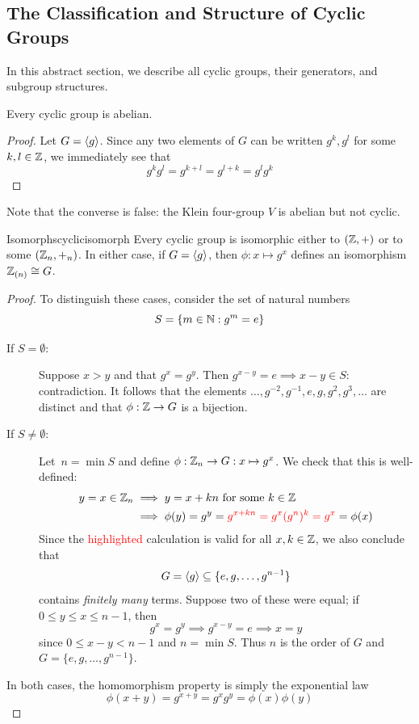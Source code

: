 \clearpage




\subsection{The Classification and Structure of Cyclic Groups}\label{sec:cyclicclass}

In this abstract section, we describe all cyclic groups, their generators, and subgroup structures.

\begin{lemm}{}{}
Every cyclic group is abelian.
\end{lemm}

\begin{proof}
Let $G=\left\langle g\right\rangle$. Since any two elements of $G$ can be written $g^k,g^l$ for some $k,l\in\mathbb{Z}$, we immediately see that
\[g^kg^l=g^{k+l}=g^{l+k}=g^lg^k\tag*{\qedhere}\]
\end{proof}

Note that the converse is false: the Klein four-group $V$ is abelian but not cyclic.




\begin{thm}{Isomorphs}{cyclicisomorph}
Every cyclic group is isomorphic either to $(\mathbb{Z},+)$ or to some $(\mathbb{Z}_n,+_n)$.\smallbreak
In either case, if $G=\left\langle g\right\rangle$, then $\phi:x\mapsto g^x$ defines an isomorphism $\mathbb{Z}_{(n)}\cong G$.
\end{thm}

\begin{proof}
To distinguish these cases, consider the set of natural numbers
\[S=\{m\in\mathbb{N}:g^m=e\}\]
\begin{description}
	\item[\normalfont If $S=\emptyset$:] Suppose $x>y$ and that $g^x=g^y$. Then $g^{x-y}=e\implies x-y\in S$: contradiction. It follows that the elements $\ldots,g^{-2},g^{-1},e,g,g^2,g^3,\ldots$ are distinct and that $\phi:\mathbb{Z}\to G$ is a bijection.
	\item[\normalfont If $S\neq\emptyset$:] Let\footnotemark\ $n=\min S$ and define $\phi:\mathbb{Z}_n\to G:x\mapsto g^x$.  We check that this is well-defined:
	\begin{align*}
	y=x\in\mathbb{Z}_n&\implies y=x+kn\text{ for some $k\in\mathbb{Z}$}\\
	&\implies \phi(y)=g^y=\textcolor{red}{g^{x+kn}=g^x(g^n)^k=g^x}=\phi(x)
	\end{align*}
	Since the \textcolor{red}{highlighted} calculation is valid for all $x,k\in\mathbb{Z}$, we also conclude that
	\[G=\left\langle g\right\rangle\subseteq\{e,g,\ldots,g^{n-1}\}\]
	contains \emph{finitely many} terms. Suppose two of these were equal; if $0\le y\le x\le n-1$, then
	\[g^x=g^y\implies g^{x-y}=e\implies x=y\]
	since $0\le x-y<n-1$ and $n=\min S$. Thus $n$ is the order of $G$ and $G=\{e,g,\ldots,g^{n-1}\}$.
\end{description}
In both cases, the homomorphism property is simply the exponential law
	\[\phi(x+y)=g^{x+y}=g^xg^y=\phi(x)\phi(y)\tag*{\qedhere}\]
\end{proof}

